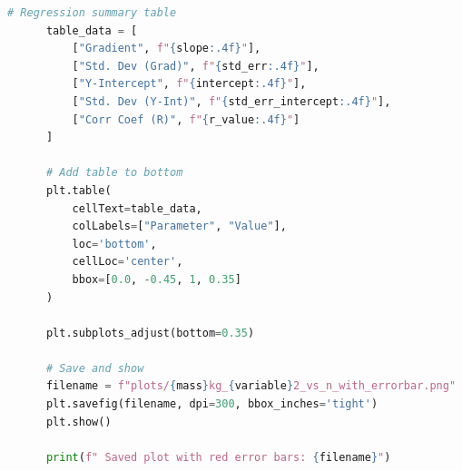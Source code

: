 \documentclass[a4paper,11pt]{article}
\begin{document}
\begin{lstlisting}[language=Python]
      # Regression summary table
      table_data = [
          ["Gradient", f"{slope:.4f}"],
          ["Std. Dev (Grad)", f"{std_err:.4f}"],
          ["Y-Intercept", f"{intercept:.4f}"],
          ["Std. Dev (Y-Int)", f"{std_err_intercept:.4f}"],
          ["Corr Coef (R)", f"{r_value:.4f}"]
      ]
  
      # Add table to bottom
      plt.table(
          cellText=table_data,
          colLabels=["Parameter", "Value"],
          loc='bottom',
          cellLoc='center',
          bbox=[0.0, -0.45, 1, 0.35]
      )
  
      plt.subplots_adjust(bottom=0.35)
  
      # Save and show
      filename = f"plots/{mass}kg_{variable}2_vs_n_with_errorbar.png"
      plt.savefig(filename, dpi=300, bbox_inches='tight')
      plt.show()
  
      print(f" Saved plot with red error bars: {filename}")  
\end{lstlisting}
\label{Graph : 1}

\newpage
\end{document}
